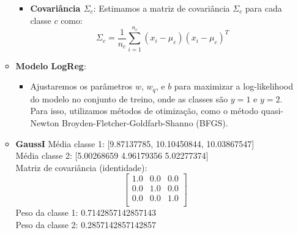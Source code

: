 \begin{enumerate}
\begin{tcolorbox}[title=Resposta:]
\begin{itemize}
\begin{itemize}
                \item \textbf{Covariância \( \Sigma_c \)}: Estimamos a matriz de covariância \( \Sigma_c \) para cada classe \( c \) como:
                \[
                \Sigma_c = \frac{1}{n_c} \sum_{i=1}^{n_c} (x_i - \mu_c)(x_i - \mu_c)^T
                \]
            \end{itemize}
        
            \item \textbf{Modelo LogReg}: 
            \begin{itemize}
                \item Ajustaremos os parâmetros \( w \), \( w_q \), e \( b \) para maximizar a log-likelihood do modelo no conjunto de treino, onde as classes são \( y = 1 \) e \( y = 2 \). Para isso, utilizamos métodos de otimização, como o método quasi-Newton Broyden-Fletcher-Goldfarb-Shanno (BFGS).
            \end{itemize}
        \end{itemize}
        
        \end{tcolorbox}

        \begin{tcolorbox}[title=Resposta (continuação):]
            \begin{itemize}
                
                \item \textbf{GaussI}
                    Média classe 1: [9.87137785, 10.10450844, 10.03867547] \\
                    Média classe 2: [5.00268659 4.96179356 5.02277374] \\
                    Matriz de covariância (identidade): 
                    \[
                    \begin{bmatrix}
                        1.0 & 0.0 & 0.0 \\
                        0.0 & 1.0 & 0.0 \\
                        0.0 & 0.0 & 1.0 \\
                    \end{bmatrix}
                    \]
                    Peso da classe 1: 0.7142857142857143 \\
                    Peso da classe 2: 0.2857142857142857


\end{itemize}
\end{tcolorbox}
\end{enumerate}
